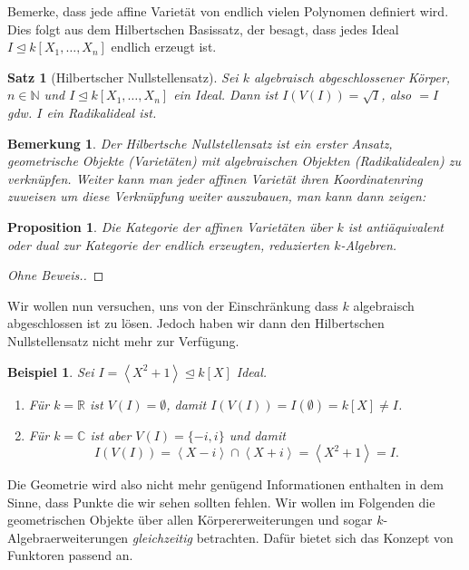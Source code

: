 \documentclass[a4paper, 11pt]{scrartcl}
\newcommand{\N}{\mathbb{N}}
\newcommand{\R}{\mathbb{R}}
\newcommand{\C}{\mathbb{C}}
\newcommand{\brackets}[1]{\left\langle #1 \right\rangle}
\theoremstyle{basicstyle}
\newtheorem{bemerkung}[definition]{Bemerkung}
\newtheorem{beispiel}[definition]{Beispiel}
\newtheorem{satz}[definition]{Satz}
\newtheorem{proposition}[definition]{Proposition}
\begin{document}
    Bemerke, dass jede affine Varietät von endlich vielen Polynomen definiert wird.
    Dies folgt aus dem Hilbertschen Basissatz, der besagt, dass jedes Ideal \(I \trianglelefteq k[X_1, \ldots, X_n]\) endlich erzeugt ist.

    \begin{satz}[Hilbertscher Nullstellensatz]
        Sei \(k\) algebraisch abgeschlossener Körper, \(n \in \N\) und \(I \trianglelefteq k[X_1, \ldots, X_n]\) ein Ideal.
        Dann ist \(I(V(I)) = \sqrt{I}\), also \(= I\) gdw. \(I\) ein Radikalideal ist.
    \end{satz}

    \begin{bemerkung}
        Der Hilbertsche Nullstellensatz ist ein erster Ansatz, geometrische Objekte (Varietäten) mit algebraischen Objekten (Radikalidealen) zu verknüpfen.
        Weiter kann man jeder affinen Varietät ihren Koordinatenring zuweisen um diese Verknüpfung weiter auszubauen, man kann dann zeigen:
    \end{bemerkung}

    \begin{proposition}
        Die Kategorie der affinen Varietäten über \(k\) ist antiäquivalent oder dual zur Kategorie der endlich erzeugten, reduzierten \(k\)-Algebren.
    \end{proposition}
    \begin{proof}[Ohne Beweis.]
    \end{proof}

    Wir wollen nun versuchen, uns von der Einschränkung dass \(k\) algebraisch abgeschlossen ist zu lösen.
    Jedoch haben wir dann den Hilbertschen Nullstellensatz nicht mehr zur Verfügung.

    \begin{beispiel}
        Sei \(I = \brackets{X^2 + 1} \trianglelefteq k[X]\) Ideal.
        \begin{enumerate}
            \item Für \(k = \R\) ist \(V(I) = \emptyset\), damit \(I(V(I)) = I(\emptyset) = k[X] \neq I\).
            \item Für \(k = \C\) ist aber \(V(I) = \{-i, i\}\) und damit 
                \[I(V(I)) = \brackets{X - i} \cap \brackets{X + i} = \brackets{X^2 + 1} = I.\]
        \end{enumerate}
    \end{beispiel}

    Die Geometrie wird also nicht mehr genügend Informationen enthalten in dem Sinne, dass Punkte die wir sehen sollten fehlen.
    Wir wollen im Folgenden die geometrischen Objekte über allen Körpererweiterungen und sogar \(k\)-Algebraerweiterungen \emph{gleichzeitig} betrachten.
    Dafür bietet sich das Konzept von Funktoren passend an.
\end{document}
